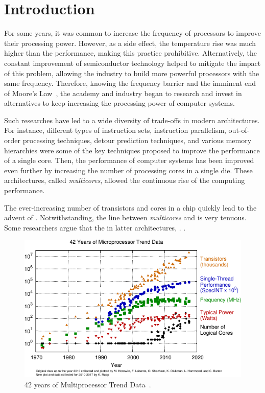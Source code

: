 \chapter{Introduction}
\label{ch.intro}

	For some years, it was common to increase the frequency of processors
	to improve their processing power.
	However, as a side effect, the temperature rise was much higher than the
	performance, making this practice prohibitive.
	Alternatively, the constant improvement of semiconductor technology helped
	to mitigate the impact of this problem, allowing the industry to build
	more powerful processors with the same frequency.
	Therefore, knowing the frequency barrier and the imminent end of Moore's Law~\cite{moore:1965},
	the academy and industry began to research and invest in alternatives
	to keep increasing the processing power of computer systems.

	Such researches have led to a wide diversity of trade-offs in modern architectures.
	For instance, different types of instruction sets, instruction parallelism,
	out-of-order processing techniques, detour prediction techniques, and various
	memory hierarchies were some of the key techniques proposed to improve the
	performance of a single core.
	Then, the performance of computer systems has been improved even further by
	increasing the number of processing cores in a single die.
	These architectures, called \textit{multicores}, allowed the continuous
	rise of the computing performance.

	The ever-increasing number of transistors and cores in a chip quickly lead
	to the advent of \manycores.
	Notwithstanding, the line between \textit{multicores} and \manycores is very tenuous.
	Some researchers argue that the in latter architectures, .
	.

	\begin{figure}[h]
		\centering
		\includegraphics[width=.85\textwidth]{images/42-years-processor-trend.pdf}

		\caption{
			42 years of Multiprocessor Trend Data~\cite{url:microprocessor-trend-data}.
		}\par
		\label{fig.microprocessor-data}
	\end{figure}


